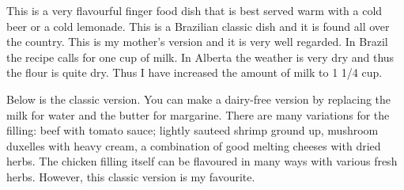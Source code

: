 \documentclass[11pt,letterpaper]{article}
\begin{document}


This is a very flavourful finger food dish that is best served warm with a cold beer or a cold lemonade. This is a Brazilian classic dish and it is found all over the country. This is my mother's version and it is very well regarded. In Brazil the recipe calls for one cup of milk. In Alberta the weather is very dry and thus the flour is quite dry. Thus I have increased the amount of milk to 1 1/4 cup.

Below is the classic version. You can make a dairy-free version  by replacing the milk for water and the butter for margarine. There are many variations for the filling: beef with tomato sauce; lightly sauteed shrimp ground up, mushroom duxelles with heavy cream, a combination of good melting cheeses with dried herbs. The chicken filling itself can be flavoured in many ways with various fresh herbs. However, this classic version is my favourite.
 
\end{document}
